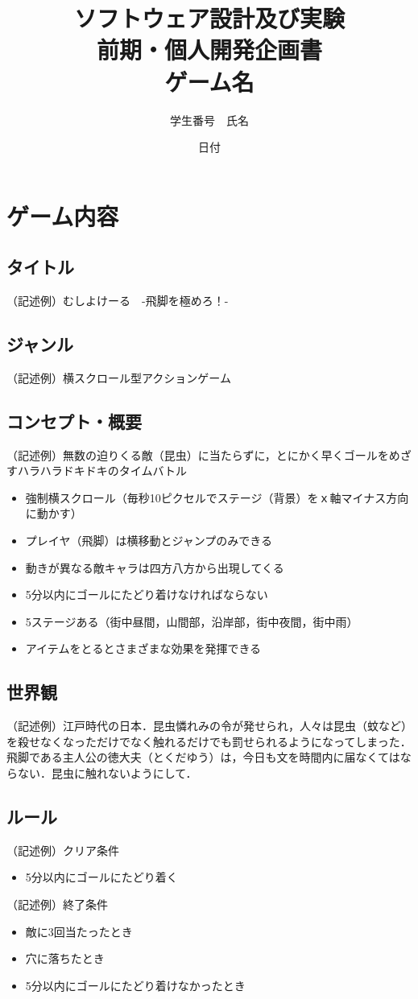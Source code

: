 \documentclass{jsarticle}
\title{ソフトウェア設計及び実験\\前期・個人開発企画書\\
	\huge{ゲーム名}
}
\author{学生番号　氏名}
\date{日付}
\begin{document}
\maketitle

\section{ゲーム内容}

\subsection{タイトル}
（記述例）むしよけーる　-飛脚を極めろ！-

\subsection{ジャンル}
（記述例）横スクロール型アクションゲーム

\subsection{コンセプト・概要}
（記述例）無数の迫りくる敵（昆虫）に当たらずに，とにかく早くゴールをめざすハラハラドキドキのタイムバトル
\begin{itemize}
\item 強制横スクロール（毎秒10ピクセルでステージ（背景）をｘ軸マイナス方向に動かす）
\item プレイヤ（飛脚）は横移動とジャンプのみできる
\item 動きが異なる敵キャラは四方八方から出現してくる
\item 5分以内にゴールにたどり着けなければならない
\item 5ステージある（街中昼間，山間部，沿岸部，街中夜間，街中雨）
\item アイテムをとるとさまざまな効果を発揮できる
\end{itemize}

\subsection{世界観}
（記述例）江戸時代の日本．昆虫憐れみの令が発せられ，人々は昆虫（蚊など）を殺せなくなっただけでなく触れるだけでも罰せられるようになってしまった．飛脚である主人公の徳大夫（とくだゆう）は，今日も文を時間内に届なくてはならない．昆虫に触れないようにして．

\subsection{ルール}
（記述例）クリア条件
\begin{itemize}
\item 5分以内にゴールにたどり着く
\end{itemize}
（記述例）終了条件
\begin{itemize}
\item 敵に3回当たったとき
\item 穴に落ちたとき
\item 5分以内にゴールにたどり着けなかったとき
\end{itemize}
\end{document}
